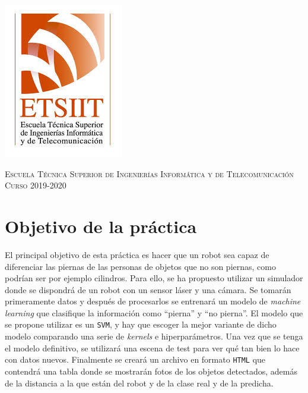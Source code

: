 \documentclass[11pt,a4paper]{article}
\begin{document}
\begin{titlepage}
\begin{minipage}{\textwidth}
\includegraphics[scale=0.3]{img/etsiit.jpeg}

\vspace{0.7cm}
\textsc{Escuela Técnica Superior de Ingenierías Informática y de Telecomunicación}\\
\vspace{1cm}
\textsc{Curso 2019-2020}
\end{minipage}
\end{titlepage}

\tableofcontents
\thispagestyle{empty}				%

\newpage

\setlength{\parskip}{1em}

\section{Objetivo de la práctica}

El principal objetivo de esta práctica es hacer que un robot sea capaz de diferenciar
las piernas de las personas de objetos que no son piernas, como podrían ser por
ejemplo cilindros. Para ello, se ha propuesto utilizar un simulador donde se dispondrá
de un robot con un sensor láser y una cámara. Se tomarán primeramente datos y después
de procesarlos se entrenará un modelo de \textit{machine learning} que clasifique la
información como ``pierna'' y ``no pierna''. El modelo que se propone utilizar es un
\texttt{SVM}, y hay que escoger la mejor variante de dicho modelo comparando una serie
de \textit{kernels} e hiperparámetros. Una vez que se tenga el modelo definitivo, se utilizará
una escena de test para ver qué tan bien lo hace con datos nuevos. Finalmente se creará
un archivo en formato \texttt{HTML} que contendrá una tabla donde se mostrarán fotos de los
objetos detectados, además de la distancia a la que están del robot y de la clase real y
de la predicha.
\end{document}
